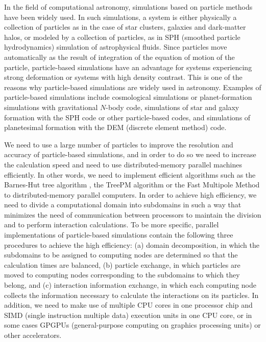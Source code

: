 In the field of computational astronomy, simulations based on particle
methods have been widely used. In such simulations, a system is either
physically a collection of particles as in the case of star clusters,
galaxies and dark-matter halos, or modeled by a collection of
particles, as in SPH (smoothed particle hydrodynamics) simulation of
astrophysical fluids.  Since particles move automatically as the
result of integration of the equation of motion of the particle,
particle-based simulations have an advantage for systems experiencing
strong deformation or systems with high density contrast.  This is one
of the reasons why particle-based simulations are widely used in
astronomy. Examples of particle-based simulations include cosmological
simulations or planet-formation simulations with gravitational
$N$-body code, simulations of star and galaxy formation with the SPH
code or other particle-based codes, and simulations of planetesimal
formation with the DEM (discrete element method) code.

We need to use a large number of particles to improve the resolution
and accuracy of particle-based simulations, and in order to do so we
need to increase the calculation speed and need to use
distributed-memory parallel machines efficiently. In other words, we
need to implement efficient algorithms such as the Barnes-Hut tree
algorithm \citep{1986Natur.324..446B}, the TreePM
algorithm \citep{1995ApJS...98..355X} or the Fast Multipole Method
\citep{2000ApJ...536L..39D} to distributed-memory parallel computers.
In order to achieve high efficiency, we need to divide a computational
domain into subdomains in such a way that minimizes the need of
communication between processors to maintain the division and to
perform interaction calculations. To be more specific, parallel
implementations of particle-based simulations contain the following
three procedures to achieve the high efficiency: (a) domain
decomposition, in which the subdomains to be assigned to computing
nodes are determined so that the calculation times are balanced, (b)
particle exchange, in which particles are moved to computing nodes
corresponding to the subdomains to which they belong, and (c)
interaction information exchange, in which each computing node
collects the information necessary to calculate the interactions on
its particles.  In addition, we need to make use of multiple CPU cores
in one processor chip and SIMD (single instruction multiple data)
execution units in one CPU core, or in some cases GPGPUs
(general-purpose computing on graphics processing units) or other
accelerators.


